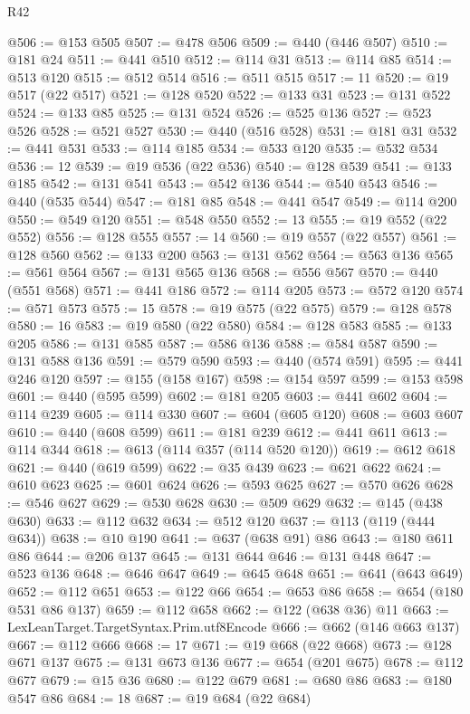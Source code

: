 \begin{lexlean}{R42}
\begin{coremodule}
@506 := @153 @505
@507 := @478 @506
@509 := @440 (@446 @507)
@510 := @181 @24
@511 := @441 @510
@512 := @114 @31
@513 := @114 @85
@514 := @513 @120
@515 := @512 @514
@516 := @511 @515
@517 := 11
@520 := @19 @517 (@22 @517)
@521 := @128 @520
@522 := @133 @31
@523 := @131 @522
@524 := @133 @85
@525 := @131 @524
@526 := @525 @136
@527 := @523 @526
@528 := @521 @527
@530 := @440 (@516 @528)
@531 := @181 @31
@532 := @441 @531
@533 := @114 @185
@534 := @533 @120
@535 := @532 @534
@536 := 12
@539 := @19 @536 (@22 @536)
@540 := @128 @539
@541 := @133 @185
@542 := @131 @541
@543 := @542 @136
@544 := @540 @543
@546 := @440 (@535 @544)
@547 := @181 @85
@548 := @441 @547
@549 := @114 @200
@550 := @549 @120
@551 := @548 @550
@552 := 13
@555 := @19 @552 (@22 @552)
@556 := @128 @555
@557 := 14
@560 := @19 @557 (@22 @557)
@561 := @128 @560
@562 := @133 @200
@563 := @131 @562
@564 := @563 @136
@565 := @561 @564
@567 := @131 @565 @136
@568 := @556 @567
@570 := @440 (@551 @568)
@571 := @441 @186
@572 := @114 @205
@573 := @572 @120
@574 := @571 @573
@575 := 15
@578 := @19 @575 (@22 @575)
@579 := @128 @578
@580 := 16
@583 := @19 @580 (@22 @580)
@584 := @128 @583
@585 := @133 @205
@586 := @131 @585
@587 := @586 @136
@588 := @584 @587
@590 := @131 @588 @136
@591 := @579 @590
@593 := @440 (@574 @591)
@595 := @441 @246 @120
@597 := @155 (@158 @167)
@598 := @154 @597
@599 := @153 @598
@601 := @440 (@595 @599)
@602 := @181 @205
@603 := @441 @602
@604 := @114 @239
@605 := @114 @330
@607 := @604 (@605 @120)
@608 := @603 @607
@610 := @440 (@608 @599)
@611 := @181 @239
@612 := @441 @611
@613 := @114 @344
@618 := @613 (@114 @357 (@114 @520 @120))
@619 := @612 @618
@621 := @440 (@619 @599)
@622 := @35 @439
@623 := @621 @622
@624 := @610 @623
@625 := @601 @624
@626 := @593 @625
@627 := @570 @626
@628 := @546 @627
@629 := @530 @628
@630 := @509 @629
@632 := @145 (@438 @630)
@633 := @112 @632
@634 := @512 @120
@637 := @113 (@119 (@444 @634))
@638 := @10 @190
@641 := @637 (@638 @91) @86
@643 := @180 @611 @86
@644 := @206 @137
@645 := @131 @644
@646 := @131 @448
@647 := @523 @136
@648 := @646 @647
@649 := @645 @648
@651 := @641 (@643 @649)
@652 := @112 @651
@653 := @122 @66
@654 := @653 @86
@658 := @654 (@180 @531 @86 @137)
@659 := @112 @658
@662 := @122 (@638 @36) @11
@663 := LexLeanTarget.TargetSyntax.Prim.utf8Encode
@666 := @662 (@146 @663 @137)
@667 := @112 @666
@668 := 17
@671 := @19 @668 (@22 @668)
@673 := @128 @671 @137
@675 := @131 @673 @136
@677 := @654 (@201 @675)
@678 := @112 @677
@679 := @15 @36
@680 := @122 @679
@681 := @680 @86
@683 := @180 @547 @86
@684 := 18
@687 := @19 @684 (@22 @684)

\end{coremodule}
\end{lexlean}
